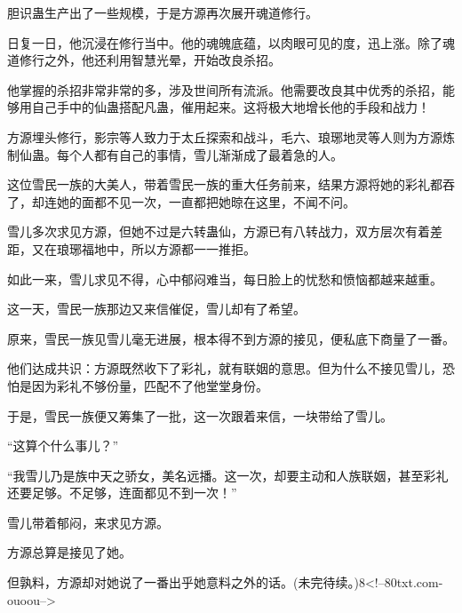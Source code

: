 \begin{this_body}
胆识蛊生产出了一些规模，于是方源再次展开魂道修行。

日复一日，他沉浸在修行当中。他的魂魄底蕴，以肉眼可见的度，迅上涨。除了魂道修行之外，他还利用智慧光晕，开始改良杀招。

他掌握的杀招非常非常的多，涉及世间所有流派。他需要改良其中优秀的杀招，能够用自己手中的仙蛊搭配凡蛊，催用起来。这将极大地增长他的手段和战力！

方源埋头修行，影宗等人致力于太丘探索和战斗，毛六、琅琊地灵等人则为方源炼制仙蛊。每个人都有自己的事情，雪儿渐渐成了最着急的人。

这位雪民一族的大美人，带着雪民一族的重大任务前来，结果方源将她的彩礼都吞了，却连她的面都不见一次，一直都把她晾在这里，不闻不问。

雪儿多次求见方源，但她不过是六转蛊仙，方源已有八转战力，双方层次有着差距，又在琅琊福地中，所以方源都一一推拒。

如此一来，雪儿求见不得，心中郁闷难当，每日脸上的忧愁和愤恼都越来越重。

这一天，雪民一族那边又来信催促，雪儿却有了希望。

原来，雪民一族见雪儿毫无进展，根本得不到方源的接见，便私底下商量了一番。

他们达成共识：方源既然收下了彩礼，就有联姻的意思。但为什么不接见雪儿，恐怕是因为彩礼不够份量，匹配不了他堂堂身份。

于是，雪民一族便又筹集了一批，这一次跟着来信，一块带给了雪儿。

“这算个什么事儿？”

“我雪儿乃是族中天之骄女，美名远播。这一次，却要主动和人族联姻，甚至彩礼还要足够。不足够，连面都见不到一次！”

雪儿带着郁闷，来求见方源。

方源总算是接见了她。

但孰料，方源却对她说了一番出乎她意料之外的话。(未完待续。)8<!--80txt.com-ouoou-->

\end{this_body}

